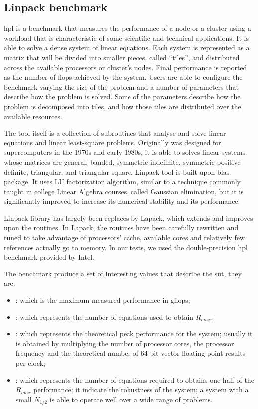 \subsection{Linpack benchmark}
\label{sec:measurements-cpu-linpack}
\ac{hpl} \cite{linpackBenchmark} is a benchmark that measures the performance of a node or a cluster
using a workload that is characteristic of some scientific and technical applications. It is able to
solve a dense system of linear equations. Each system is represented as a matrix that will be divided
into smaller pieces, called ``tiles'', and distributed across the available processors or cluster's
nodes. Final performance is reported as the number of \ac{flops} achieved by the system. Users are able
to configure the benchmark varying the size of the problem and a number of parameters that describe
how the problem is solved. Some of the parameters describe how the problem is decomposed into tiles,
and how those tiles are distributed over the available resources.

The tool itself is a collection of subroutines that analyse and solve linear equations and linear
least-square problems. Originally was designed for supercomputers in the 1970s and early 1980s, it is able
to solves linear systems whose matrices are general, banded, symmetric indefinite, symmetric positive
definite, triangular, and triangular square. Linpack tool is built upon \ac{blas} package. It
uses LU factorization algorithm, similar to a technique commonly taught in college Linear Algebra courses,
called Gaussian elimination, but it is significantly improved to increase its numerical stability and
its performance.

Linpack library has largely been replaces by Lapack, which extends and improves upon the routines. In
Lapack, the routines have been carefully rewritten and tuned to take advantage of processors' cache,
available cores and relatively few references actually go to memory. In our tests, we used the
double-precision \ac{hpl} benchmark provided by Intel.

The benchmark produce a set of interesting values that describe the \ac{sut}, they are:

\begin{itemize}
	\item{: which is the maximum measured performance in \ac{gflops};}
	\item{: which represents the number of equations used to obtain $R_{max}$;}
	\item{: which represents the theoretical peak performance for the system; usually
		it is obtained by multiplying the number of processor cores, the processor frequency and the
		theoretical number of 64-bit vector floating-point results per clock;}
	\item{: which represents the number of equations required to obtains one-half
		of the $R_{max}$ performance; it indicate the robustness of the system; a system with
		a small $N_{1/2}$ is able to operate well over a wide range of problems.}
\end{itemize}


